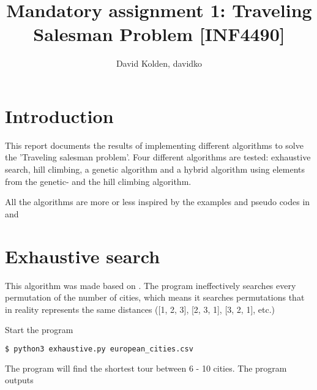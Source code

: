 \documentclass{article}
\author{David Kolden, davidko}
\title{Mandatory assignment 1: Traveling Salesman Problem [INF4490]}
\begin{document}
\maketitle
\tableofcontents

\section{Introduction}
This report documents the results of implementing different algorithms to solve the 'Traveling salesman problem'. Four different algorithms are tested: exhaustive search, hill climbing, a genetic algorithm and a hybrid algorithm using elements from the genetic- and the hill climbing algorithm.

All the algorithms are more or less inspired by the examples and pseudo codes in \cite{eiben} and \cite{marsland}
 
\section{Exhaustive search}

This algorithm was made based on \cite[chapter 9.4.1]{marsland}. The program ineffectively searches every permutation of the number of cities, which means it searches permutations that in reality represents the same distances ([1, 2, 3], [2, 3, 1], [3, 2, 1], etc.)

Start the program
\begin{lstlisting}[language=bash]
	$ python3 exhaustive.py european_cities.csv 
\end{lstlisting}
The program will find the shortest tour between 6 - 10 cities. The program outputs
\end{document}
